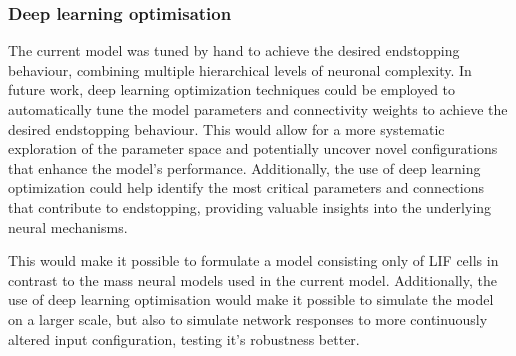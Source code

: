 \documentclass[12pt]{article}
\begin{document}
\subsubsection{Deep learning optimisation}
The current model was tuned by hand to achieve the desired endstopping behaviour, combining multiple hierarchical levels of neuronal complexity. In future work, deep learning optimization techniques could be employed to automatically tune the model parameters and connectivity weights to achieve the desired endstopping behaviour. This would allow for a more systematic exploration of the parameter space and potentially uncover novel configurations that enhance the model's performance. Additionally, the use of deep learning optimization could help identify the most critical parameters and connections that contribute to endstopping, providing valuable insights into the underlying neural mechanisms. 

This would make it possible to formulate a model consisting only of LIF cells in contrast to the mass neural models used in the current model. Additionally, the use of deep learning optimisation would make it possible to simulate the model on a larger scale, but also to simulate network responses to more continuously altered input configuration, testing it's robustness better.



\newpage
\printbibliography
\end{document}
